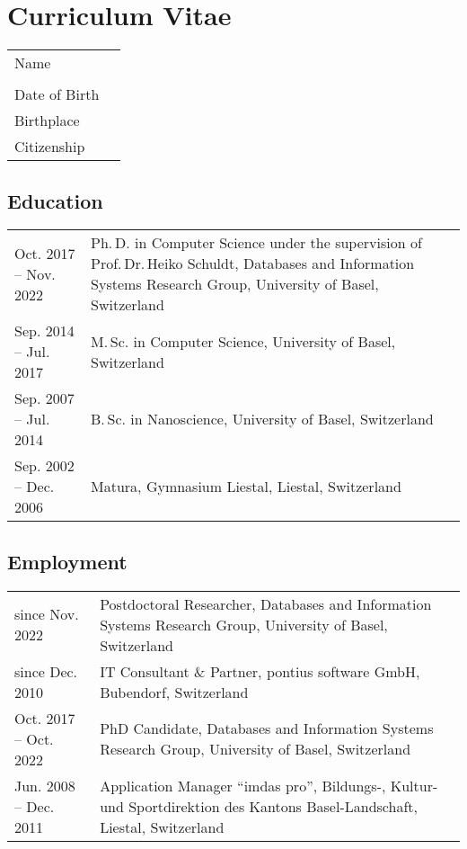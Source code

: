 
\chapter*{Curriculum Vitae}


\begin{tabularx}{\textwidth}{>{\raggedleft}p{}X}
	Name  & \thesisauthor \\
	& \thesisauthoraddress \\
	Date of Birth & \thesisauthordateofbirth \\
	Birthplace & \thesisauthorbirthplace \\
	Citizenship & \thesisauthornationalityCv \\
\end{tabularx}

\section*{Education}
\begin{tabularx}{\textwidth}{>{\raggedleft}p{}X}
	Oct. 2017 -- Nov. 2022  & Ph.\,D. in Computer Science under the supervision of Prof.\,Dr.\,Heiko Schuldt, Databases and Information Systems Research Group, University of Basel, Switzerland \\
	\rule{0pt}{3ex}%
	Sep. 2014 -- Jul. 2017  & M.\,Sc. in Computer Science, University of Basel, Switzerland \\
	\rule{0pt}{3ex}%
	Sep. 2007 -- Jul. 2014  & B.\,Sc. in Nanoscience, University of Basel, Switzerland \\
	\rule{0pt}{3ex}%
	Sep. 2002 -- Dec. 2006  & Matura, Gymnasium Liestal, Liestal, Switzerland \\
\end{tabularx}

\section*{Employment}
\begin{tabularx}{\textwidth}{>{\raggedleft}p{}X}
	since Nov. 2022  & Postdoctoral Researcher, Databases and Information Systems Research Group, University of Basel, Switzerland \\
	\rule{0pt}{3ex}%
	since Dec. 2010  & IT Consultant \& Partner, pontius software GmbH, Bubendorf, Switzerland \\
	\rule{0pt}{3ex}%
	Oct. 2017 -- Oct. 2022  & PhD Candidate, Databases and Information Systems Research Group, University of Basel, Switzerland \\
	\rule{0pt}{3ex}%
	Jun. 2008 -- Dec. 2011  & Application Manager ``imdas pro'', Bildungs-, Kultur- und Sportdirektion des Kantons Basel-Landschaft, Liestal, Switzerland
\end{tabularx}

